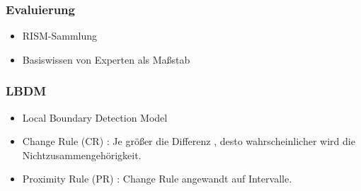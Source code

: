 \documentclass{beamer}
\begin{document}
	\begin{frame}
		\frametitle{Evaluierung}
		\begin{itemize}
			\item RISM-Sammlung
			\item Basiswissen von Experten als Maßstab
		\end{itemize}
	\end{frame}

	\begin{frame}
		\frametitle{LBDM}
		\begin{itemize}
			\item Local Boundary Detection Model
			\item Change Rule (CR) : Je größer die Differenz , desto wahrscheinlicher wird die Nichtzusammengehörigkeit.
			\item Proximity Rule (PR) : Change Rule angewandt auf Intervalle.
		\end{itemize}
	\end{frame}
\end{document}
